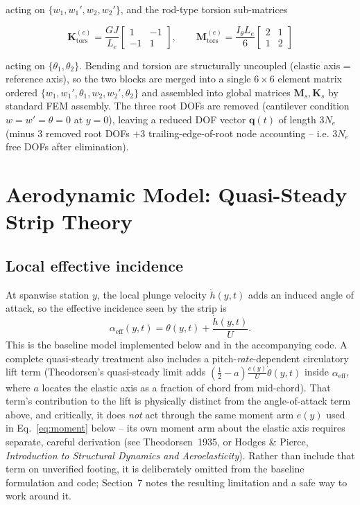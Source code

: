 \documentclass[11pt]{article}
\begin{document}
acting on $\{w_1,w_1',w_2,w_2'\}$, and the rod-type torsion sub-matrices

\begin{equation}
\bm{K}^{(e)}_{\text{tors}} = \frac{GJ}{L_e}
\begin{bmatrix} 1 & -1\\ -1 & 1 \end{bmatrix}, \qquad
\bm{M}^{(e)}_{\text{tors}} = \frac{I_\theta L_e}{6}
\begin{bmatrix} 2 & 1\\ 1 & 2 \end{bmatrix}
\end{equation}

acting on $\{\theta_1,\theta_2\}$. Bending and torsion are structurally uncoupled
(elastic axis = reference axis), so the two blocks are merged into a single $6\times6$
element matrix ordered $\{w_1,w_1',\theta_1,w_2,w_2',\theta_2\}$ and assembled into
global matrices $\bm{M}_s,\bm{K}_s$ by standard FEM assembly. The three root DOFs are
removed (cantilever condition $w=w'=\theta=0$ at $y=0$), leaving a reduced DOF vector
$\bm{q}(t)$ of length $3N_e$ (minus 3 removed root DOFs $+3$ trailing-edge-of-root node
accounting -- i.e. $3N_e$ free DOFs after elimination).

\section{Aerodynamic Model: Quasi-Steady Strip Theory}

\subsection{Local effective incidence}

At spanwise station $y$, the local plunge velocity $\dot h(y,t)$ adds an induced angle
of attack, so the effective incidence seen by the strip is
\begin{equation}
\alpha_{\text{eff}}(y,t) = \theta(y,t) + \frac{\dot h(y,t)}{U}.
\label{eq:alphaeff}
\end{equation}
This is the baseline model implemented below and in the accompanying code. A
complete quasi-steady treatment also includes a pitch-\emph{rate}-dependent
circulatory lift term (Theodorsen's quasi-steady limit adds
$\left(\tfrac12-a\right)\tfrac{c(y)}{U}\dot\theta(y,t)$ inside
$\alpha_{\text{eff}}$, where $a$ locates the elastic axis as a fraction of
chord from mid-chord). That term's contribution to the lift is physically
distinct from the angle-of-attack term above, and critically, it does \emph{not}
act through the same moment arm $e(y)$ used in
Eq.~\eqref{eq:moment} below -- its own moment arm about the elastic axis
requires separate, careful derivation (see Theodorsen~1935, or Hodges \&
Pierce, \emph{Introduction to Structural Dynamics and Aeroelasticity}). Rather
than include that term on unverified footing, it is deliberately omitted from
the baseline formulation and code; Section~7 notes the resulting limitation
and a safe way to work around it.
\end{document}
